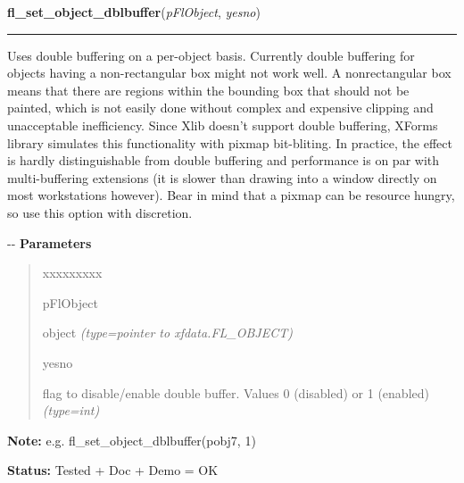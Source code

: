 \hspace{.8\funcindent}\begin{boxedminipage}{\funcwidth}

    \raggedright \textbf{fl\_set\_object\_dblbuffer}(\textit{pFlObject}, \textit{yesno})

    \vspace{-1.5ex}

    \rule{\textwidth}{0.5\fboxrule}
\setlength{\parskip}{2ex}

Uses double buffering on a per-object basis. Currently double buffering
for objects having a non-rectangular box might not work well. A
nonrectangular box means that there are regions within the bounding box
that should not be painted, which is not easily done without complex and
expensive clipping and unacceptable inefficiency. Since Xlib doesn't
support double buffering, XForms library simulates this functionality with
pixmap bit-bliting. In practice, the effect is hardly distinguishable from
double buffering and performance is on par with multi-buffering extensions
(it is slower than drawing into a window directly on most workstations
however). Bear in mind that a pixmap can be resource hungry, so use this
option with discretion.

-{}-
\setlength{\parskip}{1ex}
      \textbf{Parameters}
      \vspace{-1ex}

      \begin{quote}
        \begin{Ventry}{xxxxxxxxx}

          \item[pFlObject]


object
            {\it (type=pointer to xfdata.FL\_OBJECT)}

          \item[yesno]


flag to disable/enable double buffer. Values 0 (disabled) or 1
(enabled)
            {\it (type=int)}

        \end{Ventry}

      \end{quote}

\textbf{Note:} 
e.g. fl\_set\_object\_dblbuffer(pobj7, 1)


\textbf{Status:} 
Tested + Doc + Demo = OK


    \end{boxedminipage}

    \label{xformslib:flbasic:fl_set_object_color}

